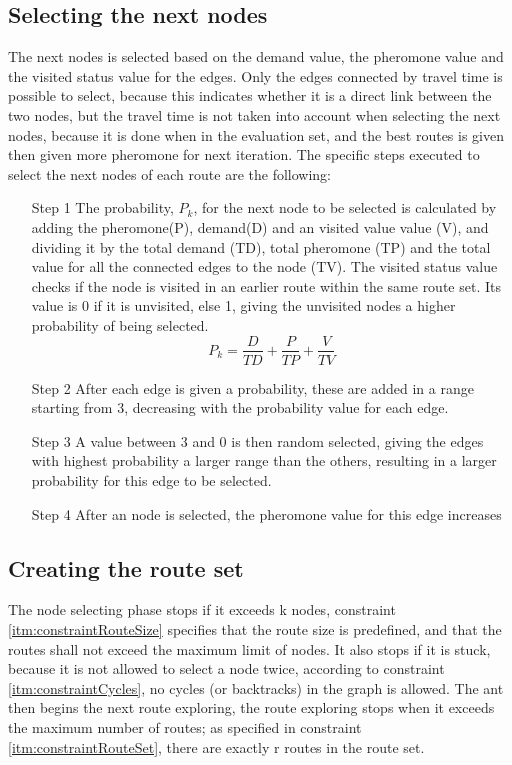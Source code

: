 \subsection{Selecting the next nodes}
The next nodes is selected based on the demand value, the pheromone value and the visited status value for the edges. Only the edges connected by travel time is possible to select, because this indicates whether it is a direct link between the two nodes, but the travel time is not taken into account when selecting the next nodes, because it is done when in the evaluation set, and the best routes is given then given more pheromone for next iteration. %
The specific steps executed to select the next nodes of each route are the following:
\begin{itemize}
\item[Step 1] The probability, $P_k$, for the next node to be selected is calculated by adding the pheromone(P), demand(D) and an visited value value (V), and dividing it by the total demand (TD), total pheromone (TP) and the total value for all the connected edges to the node (TV). The visited status value checks if the node is visited in an earlier route within the same route set. Its value is 0 if it is unvisited, else 1, giving the unvisited nodes a higher probability of being selected.
$$ P_{k} = \frac{D}{TD} + \frac{P}{TP} + \frac{V}{TV}$$ 

\item[Step 2] After each edge is given a probability, these are added in a range starting from 3, decreasing with the probability value for each edge. 
\item[Step 3] A value between 3 and 0 is then random selected, giving the edges with highest probability a larger range than the others, resulting in a larger probability for this edge to be selected. 
\item[Step 4] After an node is selected, the pheromone value for this edge increases 
\end{itemize}

\subsection{Creating the route set}
The node selecting phase stops if it exceeds k nodes, constraint \ref{itm:constraintRouteSize} specifies that the route size is predefined, and that the routes shall not exceed the maximum limit of nodes. It also stops if it is stuck, because it is not allowed to select a node twice, according to constraint \ref{itm:constraintCycles}, no cycles (or backtracks) in the graph is allowed. The ant then begins the next route exploring, the route exploring stops when it exceeds the maximum number of routes; as specified in constraint \ref{itm:constraintRouteSet}, there are exactly r routes in the route set. 

